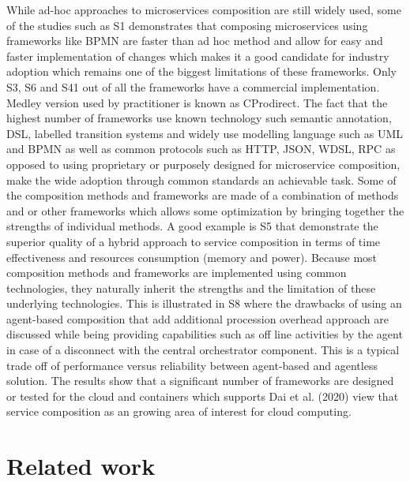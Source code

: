 \documentclass{article}
\begin{document}
\begin{multicols}{2}
While ad-hoc approaches to microservices composition are still widely used, some of the studies such as S1 demonstrates that composing microservices using frameworks like BPMN are faster than ad hoc method and allow for easy and faster implementation of changes which makes it a good candidate for industry adoption which remains one of the biggest limitations of these frameworks. Only S3, S6 and S41 out of all the frameworks have a commercial implementation. Medley version used by practitioner is known as CProdirect. 
The fact that the highest number of frameworks use known technology such semantic annotation, DSL, labelled transition systems and widely use modelling language such as UML and BPMN as well as common protocols such as HTTP, JSON, WDSL, RPC as opposed to using proprietary or purposely designed for microservice composition, make the wide adoption through common standards an achievable task. Some of the composition methods and frameworks are made of a combination of methods and or other frameworks which allows some optimization by bringing together the strengths of individual methods. A good example is S5 that demonstrate the superior quality of a hybrid approach to service composition in terms of time effectiveness and resources consumption (memory and power).
Because most composition methods and frameworks are implemented using common technologies, they naturally inherit the strengths and the limitation of these underlying technologies. This is illustrated in S8 where the drawbacks of using an agent-based composition that add additional procession overhead approach are discussed while being providing capabilities such as off line activities by the agent in case of a disconnect with the central orchestrator component. This is a typical trade off of performance versus reliability between agent-based and agentless solution.
The results show that a significant number of frameworks are designed or tested for the cloud and containers which supports Dai et al. (2020) view that service composition as an growing area of interest for cloud computing.

\section{Related work}


\end{multicols}
\end{document}
